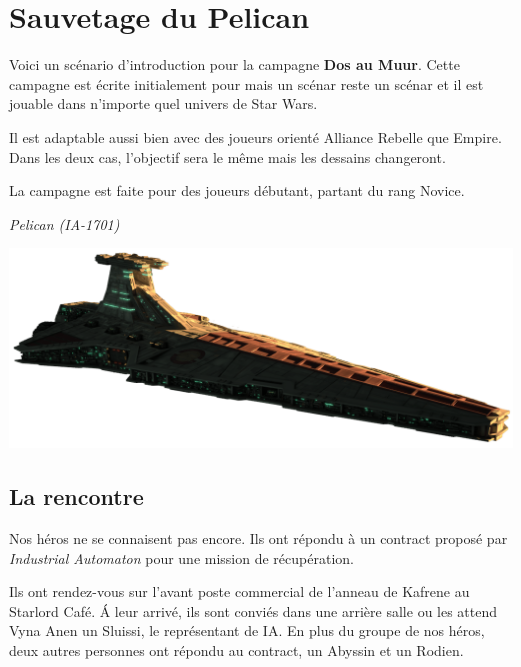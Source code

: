 \section{Sauvetage du Pelican}

Voici un scénario d'introduction pour la campagne \textbf{Dos au Muur}. Cette campagne est écrite initialement pour  mais un scénar reste un scénar et il est jouable dans n'importe quel univers de Star Wars.

Il est adaptable aussi bien avec des joueurs orienté Alliance Rebelle que Empire. Dans les deux cas, l'objectif sera le même mais les dessains changeront.

La campagne est faite pour des joueurs débutant, partant du rang Novice.

\vspace{2\baselineskip}
\begin{flushright}
	\emph{Pelican (IA-1701)}
\end{flushright}

\vspace{-4\baselineskip}

\hspace{-0.4\columnsep}\includegraphics[width=\textwidth]{_img/dos-au-muur/venator.png}
\vspace{-7\baselineskip}

\subsection{La rencontre}
Nos héros ne se connaisent pas encore. Ils ont répondu à un contract proposé par \emph{Industrial Automaton} pour une mission de récupération.

Ils ont rendez-vous sur l'avant poste commercial de l'anneau de Kafrene au Starlord Café. \'A leur arrivé, ils sont conviés dans une arrière salle ou les attend Vyna Anen un Sluissi, le représentant de IA. En plus du groupe de nos héros, deux autres personnes ont répondu au contract, un Abyssin et un Rodien.

